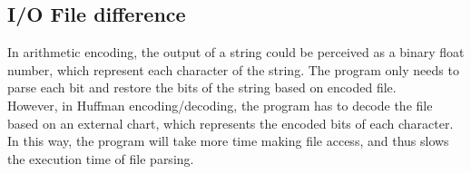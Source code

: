 	\subsection{I/O File difference}
	In arithmetic encoding, the output of a string could be perceived as a binary float number, which represent each character of the string. The program only needs to parse each bit and restore the bits of the string based on encoded file.
	\\
	However, in Huffman encoding/decoding, the program has to decode the file based on an external chart, which represents the encoded bits of each character. In this way, the program will take more time making file access, and thus slows the execution time of file parsing. 
	\\